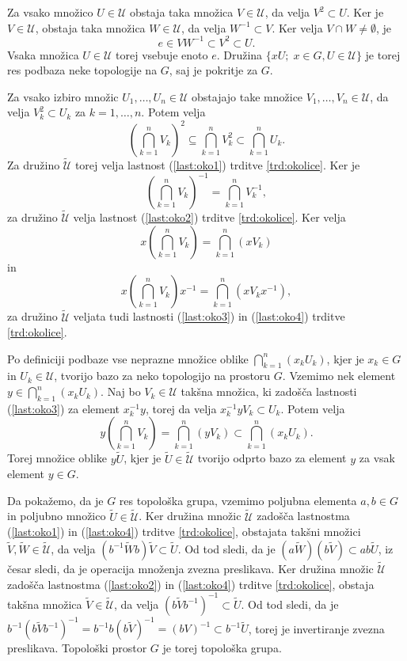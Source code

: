 \documentclass[mat1]{fmfdelo}
\newcommand{\Ucurl}{\mathcal{U}}
\begin{document}
\begin{dokaz}
Za vsako množico $U \in \Ucurl$ obstaja taka množica $V \in \Ucurl$, da velja $V^2 \subset U$. Ker je $V \in \Ucurl$, obstaja taka množica $W \in \Ucurl$, da velja $W^{-1} \subset V$. Ker velja $V \cap W \neq \emptyset$, je
\[ e \in VW^{-1} \subset V^2 \subset U. \]
Vsaka množica $U \in \Ucurl$ torej vsebuje enoto $e$.
Družina $\lbrace xU ;\; x \in G, U \in \Ucurl \rbrace$ je torej res podbaza neke topologije na $G$, saj je pokritje za $G$.

Za vsako izbiro množic $U_1,\dots,U_n \in \Ucurl$ obstajajo take množice $V_1,\dots,V_n \in \Ucurl$, da velja $V_k^2 \subset U_k$ za $k = 1,\dots,n$. Potem velja
\[ \left( \bigcap_{k=1}^n V_k \right)^2 \subseteq \bigcap_{k=1}^n V_k^2 \subset \bigcap_{k=1}^n U_k. \]
Za družino $\widetilde{\Ucurl}$ torej velja lastnost (\ref{last:oko1}) trditve \ref{trd:okolice}.
Ker je \[\left( \bigcap_{k=1}^n V_k \right)^{-1} = \bigcap_{k=1}^n V_k^{-1},\] za družino $\widetilde{\Ucurl}$ velja lastnost (\ref{last:oko2}) trditve \ref{trd:okolice}.
Ker velja \[x\left(\bigcap_{k=1}^n V_k\right) = \bigcap_{k=1}^n (xV_k)\]
in \[ x\left(\bigcap_{k=1}^n V_k\right)x^{-1} = \bigcap_{k=1}^n (xV_kx^{-1}), \]
za družino $\widetilde{\Ucurl}$ veljata tudi lastnosti (\ref{last:oko3}) in (\ref{last:oko4}) trditve \ref{trd:okolice}.

Po definiciji podbaze vse neprazne množice oblike $\bigcap_{k=1}^n(x_kU_k)$, kjer je $x_k \in G$ in $U_k \in \Ucurl$, tvorijo bazo za neko topologijo na prostoru $G$. Vzemimo nek element $y \in \bigcap_{k=1}^n (x_kU_k)$. Naj bo $V_k \in \Ucurl$ takšna množica, ki zadošča lastnosti (\ref{last:oko3}) za element $x_k^{-1}y$, torej da velja $x_k^{-1}yV_k \subset U_k$. Potem velja
\[ y\left(\bigcap_{k=1}^nV_k\right) = \bigcap_{k=1}^n(yV_k) \subset \bigcap_{k=1}^n(x_kU_k). \]
Torej množice oblike $y\widetilde{U}$, kjer je $\widetilde{U} \in \widetilde{\Ucurl}$ tvorijo odprto bazo za element $y$ za vsak element $y \in G$.

Da pokažemo, da je $G$ res topološka grupa, vzemimo poljubna elementa $a,b \in G$ in poljubno množico $\widetilde{U} \in \widetilde{\Ucurl}$. Ker družina množic $\widetilde{\Ucurl}$ zadošča lastnostma (\ref{last:oko1}) in (\ref{last:oko4}) trditve \ref{trd:okolice}, obstajata takšni množici $\widetilde{V}, \widetilde{W} \in \widetilde{\Ucurl}$, da velja $(b^{-1}\widetilde{W}b)\widetilde{V} \subset \widetilde{U}$. Od tod sledi, da je $(a\widetilde{W})(b\widetilde{V}) \subset ab\widetilde{U}$, iz česar sledi, da je operacija množenja zvezna preslikava.
Ker družina množic $\widetilde{\Ucurl}$ zadošča lastnostma (\ref{last:oko2}) in (\ref{last:oko4}) trditve \ref{trd:okolice}, obstaja takšna množica $\widetilde{V} \in \widetilde{\Ucurl}$, da velja $(b\widetilde{V}b^{-1})^{-1} \subset \widetilde{U}$. Od tod sledi, da je $b^{-1}(b\widetilde{V}b^{-1})^{-1} = b^{-1}b (b\widetilde{V})^{-1} = (bV)^{-1} \subset b^{-1}\widetilde{U}$, torej je invertiranje zvezna preslikava. Topološki prostor $G$ je torej topološka grupa.


\end{dokaz}
\end{document}
